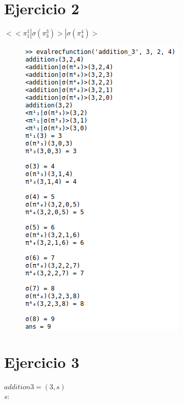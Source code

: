 \documentclass[11pt]{article}
\begin{document}
\section*{Ejercicio 2}
\begin{center}$<<\pi^1_1|\sigma\left(\pi^3_3\right)>|\sigma\left(\pi^4_4\right)>$
\\\end{center}
\begin{figure}[htp]
\centering
\includegraphics[scale=0.70]{ejemplo_ejecucion.png}
\label{}
\end{figure}

\newpage

\section*{Ejercicio 3}
\begin{whilecode}[H]
$addition3=(3, s)$
\\
$s:$
\\
\end{whilecode}
\end{document}
